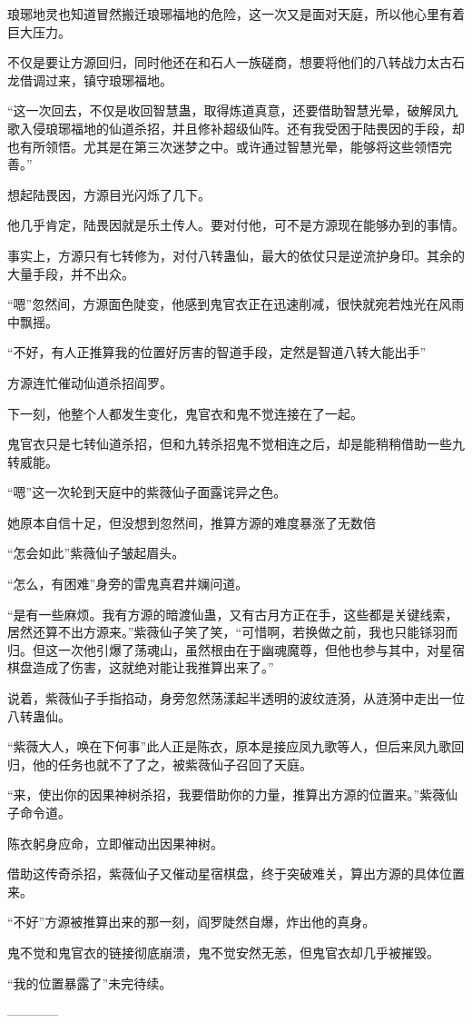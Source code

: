 \begin{this_body}
琅琊地灵也知道冒然搬迁琅琊福地的危险，这一次又是面对天庭，所以他心里有着巨大压力。

不仅是要让方源回归，同时他还在和石人一族磋商，想要将他们的八转战力太古石龙借调过来，镇守琅琊福地。

“这一次回去，不仅是收回智慧蛊，取得炼道真意，还要借助智慧光晕，破解凤九歌入侵琅琊福地的仙道杀招，并且修补超级仙阵。还有我受困于陆畏因的手段，却也有所领悟。尤其是在第三次迷梦之中。或许通过智慧光晕，能够将这些领悟完善。”

想起陆畏因，方源目光闪烁了几下。

他几乎肯定，陆畏因就是乐土传人。要对付他，可不是方源现在能够办到的事情。

事实上，方源只有七转修为，对付八转蛊仙，最大的依仗只是逆流护身印。其余的大量手段，并不出众。

“嗯”忽然间，方源面色陡变，他感到鬼官衣正在迅速削减，很快就宛若烛光在风雨中飘摇。

“不好，有人正推算我的位置好厉害的智道手段，定然是智道八转大能出手”

方源连忙催动仙道杀招阎罗。

下一刻，他整个人都发生变化，鬼官衣和鬼不觉连接在了一起。

鬼官衣只是七转仙道杀招，但和九转杀招鬼不觉相连之后，却是能稍稍借助一些九转威能。

“嗯”这一次轮到天庭中的紫薇仙子面露诧异之色。

她原本自信十足，但没想到忽然间，推算方源的难度暴涨了无数倍

“怎会如此”紫薇仙子皱起眉头。

“怎么，有困难”身旁的雷鬼真君井斓问道。

“是有一些麻烦。我有方源的暗渡仙蛊，又有古月方正在手，这些都是关键线索，居然还算不出方源来。”紫薇仙子笑了笑，“可惜啊，若换做之前，我也只能铩羽而归。但这一次他引爆了荡魂山，虽然根由在于幽魂魔尊，但他也参与其中，对星宿棋盘造成了伤害，这就绝对能让我推算出来了。”

说着，紫薇仙子手指掐动，身旁忽然荡漾起半透明的波纹涟漪，从涟漪中走出一位八转蛊仙。

“紫薇大人，唤在下何事”此人正是陈衣，原本是接应凤九歌等人，但后来凤九歌回归，他的任务也就不了了之，被紫薇仙子召回了天庭。

“来，使出你的因果神树杀招，我要借助你的力量，推算出方源的位置来。”紫薇仙子命令道。

陈衣躬身应命，立即催动出因果神树。

借助这传奇杀招，紫薇仙子又催动星宿棋盘，终于突破难关，算出方源的具体位置来。

“不好”方源被推算出来的那一刻，阎罗陡然自爆，炸出他的真身。

鬼不觉和鬼官衣的链接彻底崩溃，鬼不觉安然无恙，但鬼官衣却几乎被摧毁。

“我的位置暴露了”未完待续。

------------

\end{this_body}

